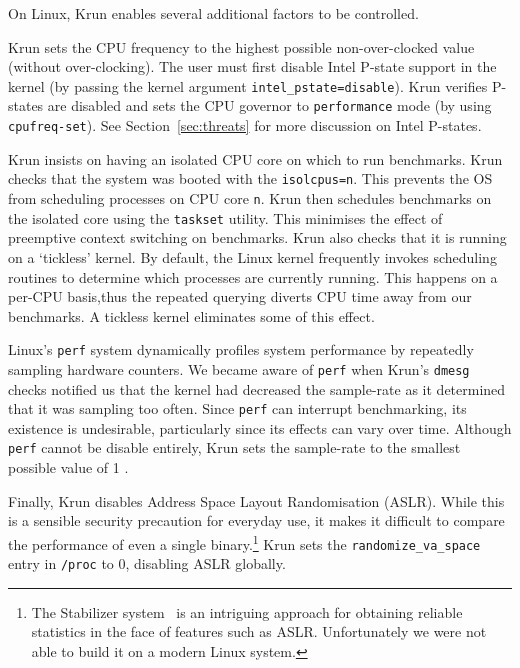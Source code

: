 \documentclass[10pt,preprint]{sigplanconf}
\newcommand{\krun}{Krun\xspace}
\begin{document}
On Linux, \krun enables several additional factors to be controlled.

\krun sets the CPU frequency to the highest possible non-over-clocked value
(without over-clocking). The user must first disable Intel P-state support in
the kernel (by passing the kernel argument \texttt{intel\_pstate=disable}).
\krun verifies P-states are disabled and sets the CPU governor to
\texttt{performance} mode (by using \texttt{cpufreq-set}). See
Section~\ref{sec:threats} for more discussion on Intel P-states.

\krun insists on having an isolated CPU core on which to run benchmarks. \krun
checks that the system was booted with the \texttt{isolcpus=n}. This prevents
the OS from scheduling processes on CPU core \texttt{n}. \krun then schedules
benchmarks on the isolated core using the \texttt{taskset} utility. This
minimises the effect of preemptive context switching on benchmarks. \krun also
checks that it is running on a `tickless' kernel. By default, the Linux kernel
frequently invokes scheduling routines to determine which processes are
currently running. This happens on a per-CPU basis,thus the repeated querying
diverts CPU time away from our benchmarks. A tickless kernel eliminates some of
this effect.

Linux's \texttt{perf} system dynamically profiles system performance by
repeatedly sampling hardware counters. We became aware of \texttt{perf} when
\krun's \texttt{dmesg} checks notified us that the kernel had decreased the
sample-rate as it determined that it was sampling too often. Since \texttt{perf}
can interrupt benchmarking, its existence is undesirable, particularly since its
effects can vary over time. Although \texttt{perf} cannot be disable entirely,
\krun sets the sample-rate to the smallest possible value of 1 .

Finally, \krun disables Address Space Layout Randomisation (ASLR). While this is
a sensible security precaution for everyday use, it makes it difficult to
compare the performance of even a single binary.\footnote{The Stabilizer
system~\cite{curtsinger} is an intriguing approach for obtaining reliable
statistics in the face of features such as ASLR. Unfortunately we were not able
to build it on a modern Linux system.} \krun sets the
\texttt{randomize\_va\_space} entry in \texttt{/proc} to 0, disabling ASLR
globally.
\end{document}
